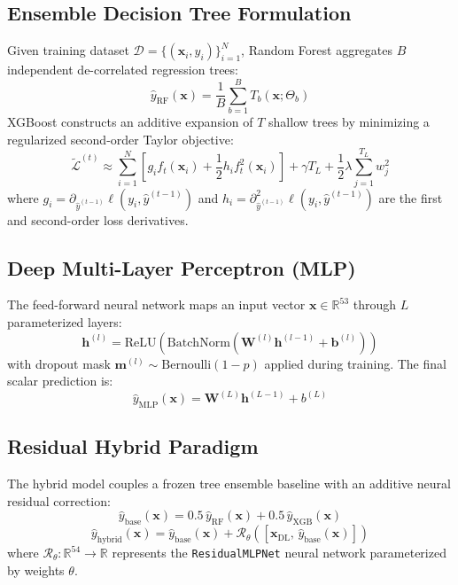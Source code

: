 \documentclass[conference]{IEEEtran}
\begin{document}
\subsection{Ensemble Decision Tree Formulation}
Given training dataset $\mathcal{D} = \{(\mathbf{x}_i, y_i)\}_{i=1}^N$, Random Forest aggregates $B$ independent de-correlated regression trees:
\begin{equation}
  \hat{y}_{\text{RF}}(\mathbf{x}) = \frac{1}{B}\sum_{b=1}^B T_b(\mathbf{x}; \Theta_b)
\end{equation}
XGBoost constructs an additive expansion of $T$ shallow trees by minimizing a regularized second-order Taylor objective:
\begin{equation}
  \tilde{\mathcal{L}}^{(t)} \approx \sum_{i=1}^N \left[ g_i f_t(\mathbf{x}_i) + \frac{1}{2}h_i f_t^2(\mathbf{x}_i) \right] + \gamma T_L + \frac{1}{2}\lambda\sum_{j=1}^{T_L} w_j^2
\end{equation}
where $g_i = \partial_{\hat{y}^{(t-1)}} \ell(y_i, \hat{y}^{(t-1)})$ and $h_i = \partial^2_{\hat{y}^{(t-1)}} \ell(y_i, \hat{y}^{(t-1)})$ are the first and second-order loss derivatives.

\subsection{Deep Multi-Layer Perceptron (MLP)}
The feed-forward neural network maps an input vector $\mathbf{x} \in \mathbb{R}^{53}$ through $L$ parameterized layers:
\begin{equation}
  \mathbf{h}^{(l)} = \text{ReLU}\left(\text{BatchNorm}\left(\mathbf{W}^{(l)}\mathbf{h}^{(l-1)} + \mathbf{b}^{(l)}\right)\right)
\end{equation}
with dropout mask $\mathbf{m}^{(l)} \sim \text{Bernoulli}(1 - p)$ applied during training. The final scalar prediction is:
\begin{equation}
  \hat{y}_{\text{MLP}}(\mathbf{x}) = \mathbf{W}^{(L)}\mathbf{h}^{(L-1)} + b^{(L)}
\end{equation}

\subsection{Residual Hybrid Paradigm}
The hybrid model couples a frozen tree ensemble baseline with an additive neural residual correction:
\begin{equation}
  \hat{y}_{\text{base}}(\mathbf{x}) = 0.5\,\hat{y}_{\text{RF}}(\mathbf{x}) + 0.5\,\hat{y}_{\text{XGB}}(\mathbf{x})
  \label{eq:base_tree}
\end{equation}
\begin{equation}
  \hat{y}_{\text{hybrid}}(\mathbf{x}) = \hat{y}_{\text{base}}(\mathbf{x}) + \mathcal{R}_{\theta}\left(\left[\mathbf{x}_{\text{DL}},\, \hat{y}_{\text{base}}(\mathbf{x})\right]\right)
  \label{eq:hybrid_pred}
\end{equation}
where $\mathcal{R}_{\theta}: \mathbb{R}^{54} \rightarrow \mathbb{R}$ represents the \texttt{ResidualMLPNet} neural network parameterized by weights $\theta$.
\end{document}
